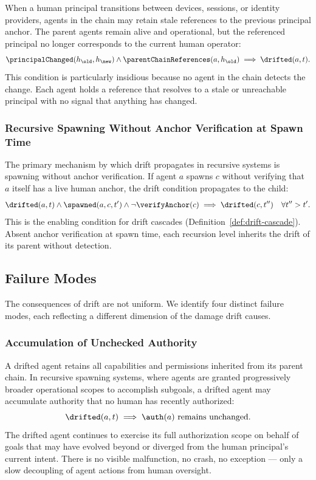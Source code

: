 When a human principal transitions between devices, sessions, or identity providers, agents in the chain may retain stale references to the previous principal anchor. The parent agents remain alive and operational, but the referenced principal no longer corresponds to the current human operator:
\begin{equation}
\principalChanged(h_{\old}, h_{\new}) \land \parentChainReferences(a, h_{\old}) \implies \drifted(a, t).
\end{equation}
This condition is particularly insidious because no agent in the chain detects the change. Each agent holds a reference that resolves to a stale or unreachable principal with no signal that anything has changed.

\subsubsection{Recursive Spawning Without Anchor Verification at Spawn Time}

The primary mechanism by which drift propagates in recursive systems is spawning without anchor verification. If agent $a$ spawns $c$ without verifying that $a$ itself has a live human anchor, the drift condition propagates to the child:
\begin{equation}
\drifted(a, t) \land \spawned(a, c, t') \land \neg \verifyAnchor(c) \implies \drifted(c, t'') \quad \forall t'' > t'.
\label{eq:propagation}
\end{equation}
This is the enabling condition for drift cascades (Definition~\ref{def:drift-cascade}). Absent anchor verification at spawn time, each recursion level inherits the drift of its parent without detection.

\subsection{Failure Modes}

The consequences of drift are not uniform. We identify four distinct failure modes, each reflecting a different dimension of the damage drift causes.

\subsubsection{Accumulation of Unchecked Authority}

A drifted agent retains all capabilities and permissions inherited from its parent chain. In recursive spawning systems, where agents are granted progressively broader operational scopes to accomplish subgoals, a drifted agent may accumulate authority that no human has recently authorized:
\begin{equation}
\drifted(a, t) \implies \auth(a) \text{ remains unchanged}.
\end{equation}
The drifted agent continues to exercise its full authorization scope on behalf of goals that may have evolved beyond or diverged from the human principal's current intent. There is no visible malfunction, no crash, no exception — only a slow decoupling of agent actions from human oversight.

